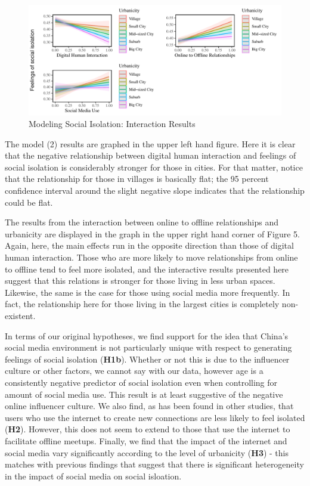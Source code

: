 \documentclass[]{interact}
\theoremstyle{plain}%
\theoremstyle{definition}
\theoremstyle{remark}
\begin{document}
\begin{figure}

{\centering \includegraphics{Social-Isolation-in-China_files/figure-pdf/fig-social-isolation-interactions-1.pdf}

}

\caption{\label{fig-social-isolation-interactions}Modeling Social
Isolation: Interaction Results}

\end{figure}

The model (2) results are graphed in the upper left hand figure. Here it
is clear that the negative relationship between digital human
interaction and feelings of social isolation is considerably stronger
for those in cities. For that matter, notice that the relationship for
those in villages is basically flat; the 95 percent confidence interval
around the slight negative slope indicates that the relationship could
be flat.

The results from the interaction between online to offline relationships
and urbanicity are displayed in the graph in the upper right hand corner
of Figure 5. Again, here, the main effects run in the opposite direction
than those of digital human interaction. Those who are more likely to
move relationships from online to offline tend to feel more isolated,
and the interactive results presented here suggest that this relations
is stronger for those living in less urban spaces. Likewise, the same is
the case for those using social media more frequently. In fact, the
relationship here for those living in the largest cities is completely
non-existent.

In terms of our original hypotheses, we find support for the idea that
China's social media environment is not particularly unique with respect
to generating feelings of social isolation (\textbf{H1b}). Whether or
not this is due to the influencer culture or other factors, we cannot
say with our data, however age is a consistently negative predictor of
social isolation even when controlling for amount of social media use.
This result is at least suggestive of the negative online influencer
culture. We also find, as has been found in other studies, that users
who use the internet to create new connections are less likely to feel
isolated (\textbf{H2}). However, this does not seem to extend to those
that use the internet to facilitate offline meetups. Finally, we find
that the impact of the internet and social media vary significantly
according to the level of urbanicity (\textbf{H3}) - this matches with
previous findings that suggest that there is significant heterogeneity
in the impact of social media on social isloation.
\end{document}

